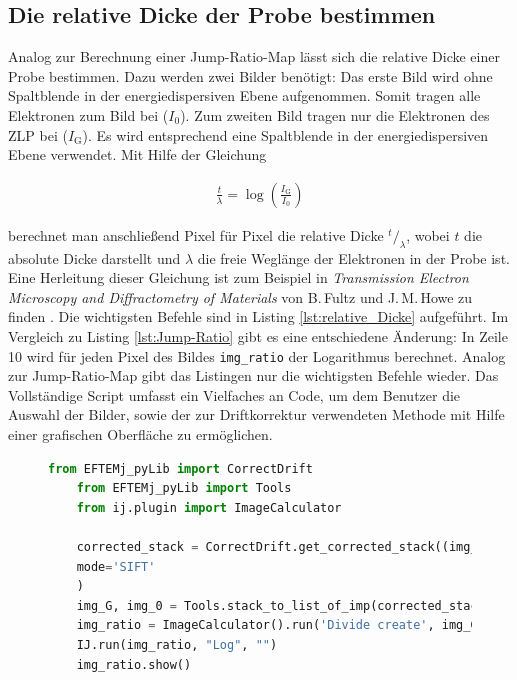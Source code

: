 \documentclass[
	paper=a4,				%
	twoside=true,			%
	BCOR=6mm,				%
	fontsize=12pt,			%
	pagesize=auto,			%
	numbers=noenddot,		%
	bibliography=totoc,		%
	draft=false
]{scrartcl}
\begin{document}
\subsection*{Die relative Dicke der Probe bestimmen} \label{append:Log-Ratio-Script}

Analog zur Berechnung einer Jump-Ratio-Map lässt sich die relative Dicke einer Probe bestimmen. Dazu werden zwei Bilder benötigt: Das erste Bild wird ohne Spaltblende in der energiedispersiven Ebene aufgenommen. Somit tragen alle Elektronen zum Bild bei ($I_0$). Zum zweiten Bild tragen nur die Elektronen des ZLP bei ($I_\mathrm{G}$). Es wird entsprechend eine Spaltblende in der energiedispersiven Ebene verwendet. Mit Hilfe der Gleichung 

\begin{align}
\frac{t}{\lambda} = \log\left(\frac{I_\mathrm{G}}{I_0}\right)
\end{align}

berechnet man anschließend Pixel für Pixel die relative Dicke $^t/_\lambda$, wobei $t$ die absolute Dicke darstellt und $\lambda$ die freie Weglänge der Elektronen in der Probe ist. Eine Herleitung dieser Gleichung ist zum Beispiel in \textit{Transmission Electron Microscopy and Diffractometry of Materials} von B.\,Fultz und J.\,M.\,Howe zu finden \cite[S.\ 175ff]{fultz_transmission_2008}. Die wichtigsten Befehle sind in Listing \ref{lst:relative_Dicke} aufgeführt. Im Vergleich zu Listing \ref{lst:Jump-Ratio} gibt es eine entschiedene Änderung: In Zeile 10 wird für jeden Pixel des Bildes \texttt{img\_ratio} der Logarithmus berechnet. Analog zur Jump-Ratio-Map gibt das Listingen nur die wichtigsten Befehle wieder. Das Vollständige Script umfasst ein Vielfaches an Code, um dem Benutzer die Auswahl der Bilder, sowie der zur Driftkorrektur verwendeten Methode mit Hilfe einer grafischen Oberfläche zu ermöglichen.

\begin{figure}
	\begin{lstlisting}[language=Python,caption={Die wichtigsten drei Zeilen Code bei der Berechnung der relativen Dicke.},label={lst:relative_Dicke}]
	from EFTEMj_pyLib import CorrectDrift
	from EFTEMj_pyLib import Tools
	from ij.plugin import ImageCalculator
	
	corrected_stack = CorrectDrift.get_corrected_stack((img_G_in, img_0_in),
	mode='SIFT'
	)
	img_G, img_0 = Tools.stack_to_list_of_imp(corrected_stack)
	img_ratio = ImageCalculator().run('Divide create', img_G, img_0)
	IJ.run(img_ratio, "Log", "")
	img_ratio.show()
	\end{lstlisting}
\end{figure}
\end{document}
